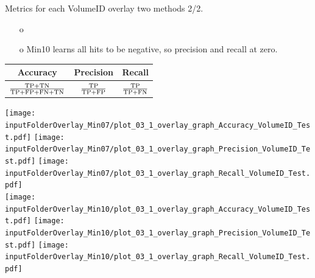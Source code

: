 \documentclass{beamer}
\begin{document}
\begin{frame}{Metrics for each VolumeID overlay two methods 2/2.}
\begin{enumerate}
\item[o] \item[o] Min10 learns all hits to be negative, so precision and recall at zero.
\end{enumerate}
\centering
\begin{center}
\begin{tabular}{ |c|c|c| } 
\hline
Accuracy & Precision & Recall \\ 
\hline
$\frac{\TP+\TN}{\TP+\FP+\FN+\TN}$ & $\frac{\TP}{\TP+\FP}$  & $\frac{\TP}{\TP+\FN}$ \\ 
\hline
\end{tabular}
\end{center}
\texttt{[image: \\inputFolderOverlay\_Min07/plot\_03\_1\_overlay\_graph\_Accuracy\_VolumeID\_Test.pdf]}
\texttt{[image: \\inputFolderOverlay\_Min07/plot\_03\_1\_overlay\_graph\_Precision\_VolumeID\_Test.pdf]}
\texttt{[image: \\inputFolderOverlay\_Min07/plot\_03\_1\_overlay\_graph\_Recall\_VolumeID\_Test.pdf]}\\
\texttt{[image: \\inputFolderOverlay\_Min10/plot\_03\_1\_overlay\_graph\_Accuracy\_VolumeID\_Test.pdf]}
\texttt{[image: \\inputFolderOverlay\_Min10/plot\_03\_1\_overlay\_graph\_Precision\_VolumeID\_Test.pdf]}
\texttt{[image: \\inputFolderOverlay\_Min10/plot\_03\_1\_overlay\_graph\_Recall\_VolumeID\_Test.pdf]}\\
\end{frame}
\end{document}
